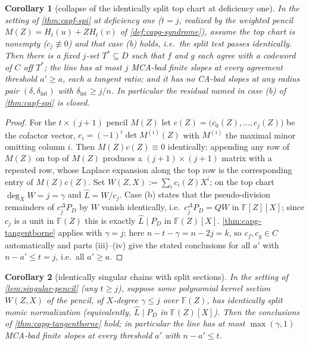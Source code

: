 \documentclass[11pt]{article}
\newtheorem{corollary}[corollary]{Corollary}
\theoremstyle{definition}
\theoremstyle{remark}
\newcommand{\F}{\mathbb{F}}
\begin{document}
\begin{corollary}[collapse of the identically split top chart at deficiency
one]\label{cor:capg-spib}
In the setting of \cref{thm:capf-spi} at deficiency one ($t=j$, realized by
the weighted pencil $M(Z)=H_t(u)+ZH_t(v)$ of \cref{def:capg-syndrome}),
assume the top chart is nonempty ($c_j\not\equiv 0$) and that case (b)
holds, i.e.\ the split test passes identically.  Then there is a fixed
$j$-set $T^{*}\subseteq D$ such that $f$ and $g$ each agree with a codeword
of $C$ off $T^{*}$; the line has at most $j$ MCA-bad finite slopes at every
agreement threshold $a'\geq a$, each a tangent ratio; and it has no CA-bad
slopes at any radius pair $(\delta,\delta_{\mathrm{int}})$ with
$\delta_{\mathrm{int}}\geq j/n$.  In particular the residual named in case
(b) of \cref{thm:capf-spi} is closed.
\end{corollary}

\begin{proof}
For the $t\times(j+1)$ pencil $M(Z)$ let
$c(Z)=\big(c_0(Z),\dots,c_j(Z)\big)$ be the cofactor vector,
$c_i=(-1)^i\det M^{(i)}(Z)$ with $M^{(i)}$ the maximal minor omitting column
$i$.  Then $M(Z)c(Z)\equiv 0$ identically: appending any row of $M(Z)$ on
top of $M(Z)$ produces a $(j+1)\times(j+1)$ matrix with a repeated row,
whose Laplace expansion along the top row is the corresponding entry of
$M(Z)c(Z)$.  Set $W(Z,X):=\sum_i c_i(Z)X^i$; on the top chart
$\deg_XW=j=\gamma$ and $\widehat{L}=W/c_j$.  Case (b) states that the
pseudo-division remainders of $c_j^{\Delta}P_D$ by $W$ vanish identically,
i.e.\ $c_j^{\Delta}P_D=QW$ in $\F[Z][X]$; since $c_j$ is a unit in $\F(Z)$
this is exactly $\widehat{L}\mid P_D$ in $\F(Z)[X]$.
\cref{thm:capg-tangentborne} applies with $\gamma=j$; here
$n-t-\gamma=n-2j=k$, so $c_f,c_g\in C$ automatically and parts (iii)--(iv)
give the stated conclusions for all $a'$ with $n-a'\leq t=j$, i.e.\ all
$a'\geq a$.
\end{proof}

\begin{corollary}[identically singular chains with split
sections]\label{cor:capg-singular}
In the setting of \cref{lem:singular-pencil} (any $t\geq j$), suppose some
polynomial kernel section $W(Z,X)$ of the pencil, of $X$-degree
$\gamma\leq j$ over $\F(Z)$, has identically split monic normalization
(equivalently, $\widehat{L}\mid P_D$ in $\F(Z)[X]$).  Then the conclusions
of \cref{thm:capg-tangentborne} hold; in particular the line has at most
$\max(\gamma,1)$ MCA-bad finite slopes at every threshold $a'$ with
$n-a'\leq t$.
\end{corollary}
\end{document}
